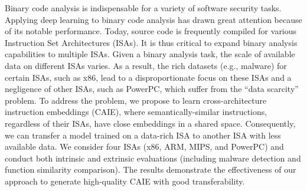Binary code analysis is indispensable for a variety of software security tasks. Applying deep learning to binary code analysis has drawn great attention because of its notable performance. Today, source code is frequently compiled for various Instruction Set Architectures (ISAs). It is thus critical to expand binary analysis capabilities to multiple ISAs. Given a binary analysis task, the scale of available data on different ISAs varies. As a result, the rich datasets (e.g., malware) for certain ISAs, such as x86, lead to a disproportionate focus on these ISAs and a negligence of other ISAs, such as PowerPC, which suffer from the “data scarcity” problem. To address the problem, we propose to learn cross-architecture instruction embeddings (CAIE), where semantically-similar instructions, regardless of their ISAs, have close embeddings in a shared space. Consequently, we can transfer a model trained on a data-rich ISA to another ISA with less available data. We consider four ISAs (x86, ARM, MIPS, and PowerPC) and conduct both intrinsic and extrinsic evaluations (including malware detection and function similarity comparison). The results demonstrate the effectiveness of our approach to generate high-quality CAIE with good transferability.